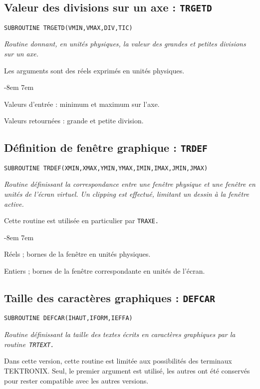 \documentclass[a4paper,12pt,titlepage]{article}
\newcommand{\darg}[1]{\item[\tt #1\rm]}
\newcommand{\fsub}[1]{\hbox {\tt SUBROUTINE #1  } \medskip }
\newenvironment{argdesc}{\begin{list}{-}{\leftmargin 8em \labelwidth 7em}}%
{\end{list}}
\begin{document}
\subsection{Valeur des divisions sur un axe : \tt TRGETD}
\fsub{TRGETD(VMIN,VMAX,DIV,TIC)}

    \em Routine donnant, en unit\'es physiques, la valeur des grandes et
petites divisions sur un axe.\em

    Les arguments sont des r\'eels exprim\'es en unit\'es physiques.

\begin{argdesc}
    \darg{VMIN,VMAX :} Valeurs d'entr\'ee : minimum et maximum sur l'axe.
    \darg{DIV~,TIC~ :} Valeurs retourn\'ees : grande et petite division.
\end{argdesc}

\subsection{D\'efinition de fen\^etre graphique : \tt TRDEF}
\fsub{TRDEF(XMIN,XMAX,YMIN,YMAX,IMIN,IMAX,JMIN,JMAX)}

    \em Routine d\'efinissant la correspondance entre une fen\^etre physique
et une fen\^etre en unit\'es de l'\'ecran virtuel. Un clipping est
effectu\'e, limitant un dessin \`a la fen\^etre active.\em

   Cette routine est utilis\'ee en particulier par \tt TRAXE\rm.

\begin{argdesc}
    \darg{XMIN,XMAX,YMIN,YMAX :}
              R\'eels ;  bornes de la fen\^etre en unit\'es physiques.
    \darg{IMIN,IMAX,JMIN,JMAX :}
              Entiers ;   bornes  de  la fen\^etre  correspondante  en 
              unit\'es de l'\'ecran.
\end{argdesc}

\subsection{Taille des caract\`eres graphiques : \tt DEFCAR}
\fsub{DEFCAR(IHAUT,IFORM,IEFFA)}

    \em Routine d\'efinissant la taille des textes \'ecrits en caract\`eres
graphiques par la routine\em\ \tt TRTEXT\rm\em .\em

   Dans cette version, cette routine est limit\'ee aux possibilit\'es des
terminaux TEKTRONIX. Seul, le premier argument est utilis\'e, les autres ont
\'et\'e conserv\'es pour rester compatible avec les autres versions.
\end{document}
